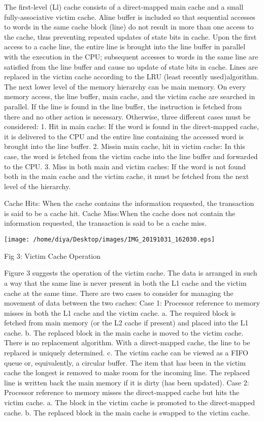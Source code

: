 \documentclass [ 12pt, letterpaper, twoside] {article}
\begin{document}
The first-level (Ll) cache consists of a direct-mapped main cache and a small fully-associative victim cache. Aline buffer is included so that sequential accesses to words in the same cache block (line) do not result in more than one access to the cache, thus preventing repeated updates of state bits in cache. Upon the first access to a cache line, the entire line is brought into the line buffer in parallel with the execution in the CPU; subsequent accesses to words in the same line are satisfied from the line buffer and cause no update of state bits in cache. Lines are replaced in the victim cache according to the LRU (least recently used)algorithm. The next lower level of the memory hierarchy can be main memory. On every memory access, the line buffer, main cache, and the victim cache are searched in parallel. If the line is found in the line buffer, the instruction is fetched from there and no other action is necessary. Otherwise, three different cases must be considered:
1. Hit in main cache: If the word is found in the direct-mapped cache, it is delivered to the CPU and the entire line containing the accessed word is brought into the line buffer.
2. Missin main cache, hit in victim cache: In this case, the word is fetched from the victim cache into the line buffer and forwarded to the CPU.
3. Miss in both main and victim caches: If the word is not found both in the main cache and the victim cache, it must be fetched from the next level of the hierarchy.

Cache Hits: When the cache contains the information requested, the transaction is said to be a cache hit.
Cache Miss:When the cache does not contain the information requested, the transaction is said to be a cache miss.

\texttt{[image: /home/diya/Desktop/images/IMG\_20191031\_162030.eps]}

Fig 3: Victim Cache Operation

Figure 3 suggests the operation of the victim cache. The data is arranged in such a way that the same line is never present in both the L1 cache and the victim cache at the same time. There are two cases to consider for managing the movement of data between the two caches:
Case 1: Processor reference to memory misses in both the L1 cache and the victim cache.
a. The required block is fetched from main memory (or the L2 cache if present) and placed into the L1 cache.
b. The replaced block in the main cache is moved to the victim cache. There is no replacement algorithm. With a direct-mapped cache, the line to be replaced is uniquely determined.
c. The victim cache can be viewed as a FIFO queue or, equivalently, a circular buffer. The item that has been in the victim cache the longest is removed to make room for the incoming line. The replaced line is written back the main memory if it is dirty (has been updated).
Case 2: Processor reference to memory misses the direct-mapped cache but hits the victim cache.
a. The block in the victim cache is promoted to the direct-mapped cache.
b. The replaced block in the main cache is swapped to the victim cache.
\end{document}
